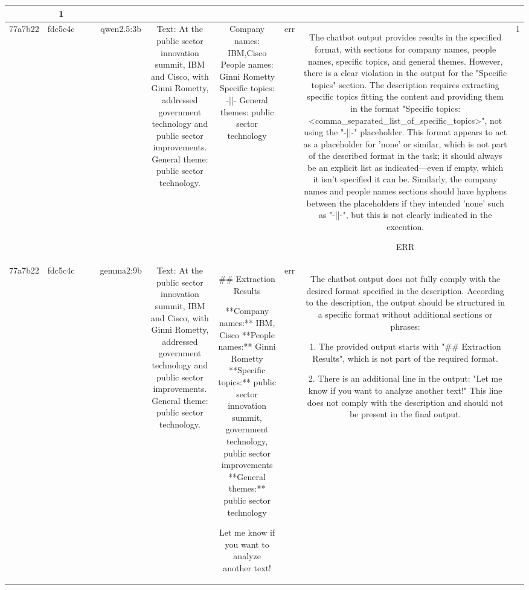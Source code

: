 \begin{table}[h!]
\begin{tabular}{|c|c|c|c|c|c|c|c|c|c|}
{No violation.
OK & 1\\
\hline
77a7b22 & fdc5c4c &  &  & qwen2.5:3b & Text: At the public sector innovation summit, IBM and Cisco, with Ginni Rometty, addressed government technology and public sector improvements. General theme: public sector technology. & Company names: IBM,Cisco
People names: Ginni Rometty
Specific topics: -||-
General themes: public sector technology & err & The chatbot output provides results in the specified format, with sections for company names, people names, specific topics, and general themes. However, there is a clear violation in the output for the "Specific topics" section. The description requires extracting specific topics fitting the content and providing them in the format "Specific topics: <comma_separated_list_of_specific_topics>", not using the "-||-" placeholder. This format appears to act as a placeholder for 'none' or similar, which is not part of the described format in the task; it should always be an explicit list as indicated—even if empty, which it isn't specified it can be. Similarly, the company names and people names sections should have hyphens between the placeholders if they intended 'none' such as "-||-", but this is not clearly indicated in the execution.

ERR & 1\\
\hline
77a7b22 & fdc5c4c &  &  & gemma2:9b & Text: At the public sector innovation summit, IBM and Cisco, with Ginni Rometty, addressed government technology and public sector improvements. General theme: public sector technology. & ## Extraction Results

**Company names:** IBM, Cisco 
**People names:** Ginni Rometty
**Specific topics:** public sector innovation summit, government technology, public sector improvements 
**General themes:** public sector technology  


Let me know if you want to analyze another text! 
 & err & The chatbot output does not fully comply with the desired format specified in the description. According to the description, the output should be structured in a specific format without additional sections or phrases:

1. The provided output starts with "## Extraction Results", which is not part of the required format.

2. There is an additional line in the output: "Let me know if you want to analyze another text!" This line does not comply with the description and should not be present in the final output.

}
\end{tabular}
\end{table}
